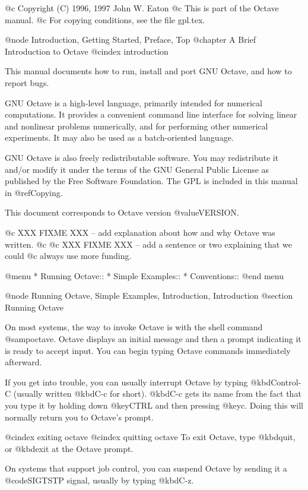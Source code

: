 @c Copyright (C) 1996, 1997 John W. Eaton
@c This is part of the Octave manual.
@c For copying conditions, see the file gpl.tex.

@node Introduction, Getting Started, Preface, Top
@chapter A Brief Introduction to Octave
@cindex introduction

This manual documents how to run, install and port GNU Octave, and how
to report bugs.

GNU Octave is a high-level language, primarily intended for numerical
computations.  It provides a convenient command line interface for
solving linear and nonlinear problems numerically, and for performing
other numerical experiments.  It may also be used as a batch-oriented
language.

GNU Octave is also freely redistributable software.  You may
redistribute it and/or modify it under the terms of the GNU General
Public License as published by the Free Software Foundation.  The GPL is
included in this manual in @ref{Copying}.

This document corresponds to Octave version @value{VERSION}.

@c XXX FIXME XXX -- add explanation about how and why Octave was written.
@c
@c XXX FIXME XXX -- add a sentence or two explaining that we could
@c                  always use more funding.

@menu
* Running Octave::              
* Simple Examples::             
* Conventions::                 
@end menu

@node Running Octave, Simple Examples, Introduction, Introduction
@section Running Octave

On most systems, the way to invoke Octave is with the shell command
@samp{octave}.  Octave displays an initial message and then a prompt
indicating it is ready to accept input.  You can begin typing Octave
commands immediately afterward.

If you get into trouble, you can usually interrupt Octave by typing
@kbd{Control-C} (usually written @kbd{C-c} for short).  @kbd{C-c} gets
its name from the fact that you type it by holding down @key{CTRL} and
then pressing @key{c}.  Doing this will normally return you to Octave's
prompt.

@cindex exiting octave
@cindex quitting octave
To exit Octave, type @kbd{quit}, or @kbd{exit} at the Octave prompt.

On systems that support job control, you can suspend Octave by sending
it a @code{SIGTSTP} signal, usually by typing @kbd{C-z}.

